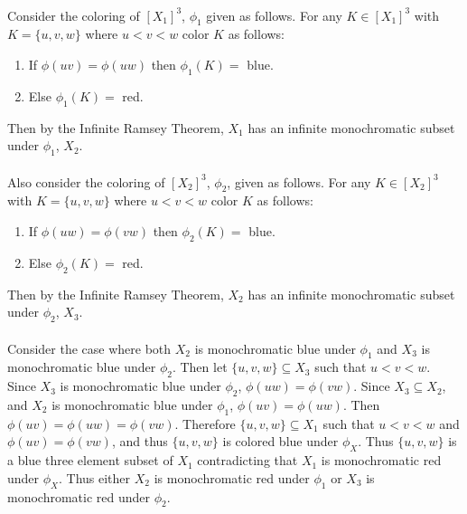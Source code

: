 \documentclass[letterpaper,12pt,oneside,onecolumn]{article}
\begin{document}
\paragraph{}
Consider the coloring of $[X_1]^3$, $\phi_1$ given as follows. For any $K \in [X_1]^3$ with $K = \{u,v,w\}$ where $u<v<w$ color $K$ as follows:
\begin{enumerate}
\item If $\phi(uv) = \phi(uw)$ then $\phi_1(K)=$ blue.
\item Else $\phi_1(K)=$  red.
\end{enumerate}
Then by the Infinite Ramsey Theorem, $X_1$ has an infinite monochromatic subset under $\phi_1$, $X_2$.
\paragraph{}
Also consider the coloring of $[X_2]^3$, $\phi_2$, given as follows. For any $K \in [X_2]^3$ with $K = \{u,v,w\}$ where $u<v<w$ color $K$ as follows:
\begin{enumerate}
\item If $\phi(uw) = \phi(vw)$ then $\phi_2(K)=$ blue.
\item Else $\phi_2(K)=$ red.
\end{enumerate}
Then by the Infinite Ramsey Theorem, $X_2$ has an infinite monochromatic subset under $\phi_2$, $X_3$.
\paragraph{}
Consider the case where both $X_2$ is monochromatic blue under $\phi_1$ and $X_3$ is monochromatic blue under $\phi_2$. Then let $\{u,v,w\} \subseteq X_3$ such that $u<v<w$. Since $X_3$ is monochromatic blue under $\phi_2$, $\phi(uw) = \phi(vw)$. Since $X_3 \subseteq X_2$, and $X_2$ is monochromatic blue under $\phi_1$, $\phi(uv) = \phi(uw)$. Then $\phi(uv) = \phi(uw) = \phi(vw)$. Therefore $\{u,v,w\} \subseteq X_1$ such that $u<v<w$ and $\phi(uv) = \phi(vw)$, and thus $\{u,v,w\}$ is colored blue under $\phi_X$. Thus $\{u,v,w\}$ is a blue three element subset of $X_1$ contradicting that $X_1$ is monochromatic red under $\phi_X$. Thus either $X_2$ is monochromatic red under $\phi_1$ or $X_3$ is monochromatic red under $\phi_2$.
\end{document}
